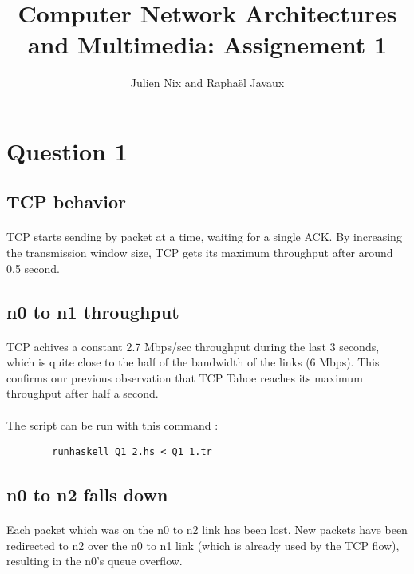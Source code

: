 \documentclass[a4paper]{article}
\title{Computer Network Architectures and Multimedia: Assignement 1}
\author{Julien Nix and Raphaël Javaux}
\date{}
\begin{document}
\maketitle

 \section{Question 1}

   \subsection{TCP behavior}

    \paragraph{}TCP starts sending by packet at a time, waiting for a single ACK.
By increasing the transmission window size, TCP gets its maximum throughput
after around 0.5 second.

   \subsection{n0 to n1 throughput}

    \paragraph{}TCP achives a constant 2.7 Mbps/sec throughput during the last
3 seconds, which is quite close to the half of the bandwidth of the links
(6 Mbps).
This confirms our previous observation that TCP Tahoe reaches its maximum
throughput after half a second.

    \paragraph{}The script can be run with this command :
    \begin{verbatim}
        runhaskell Q1_2.hs < Q1_1.tr
    \end{verbatim}

   \subsection{n0 to n2 falls down}

   \paragraph{}Each packet which was on the n0 to n2 link has been lost.
New packets have been redirected to n2 over the n0 to n1 link (which is already
used by the TCP flow), resulting in the n0's queue overflow.
\end{document}
